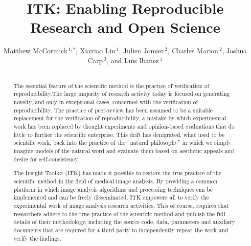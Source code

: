 \documentclass{frontiersENG} %
\def\journal{Neuroinformatics}%
\def\firstAuthorLast{Sample {et~al.}} %
\def\Authors{Matthew McCormick\,$^{1,*}$,
  Xiaxiao Liu\,$^{1}$,
  Julien Jomier\,$^{2}$,
  Charles Marion\,$^{2}$,
  Joshua Carp\,$^{3}$,
  and Luis Ibanez\,$^1$}
\begin{document}
\onecolumn
{}

\title[ITK Reproducible Research]{ITK: Enabling Reproducible Research and Open Science}
\author[\firstAuthorLast ]{\Authors}
\address{}
\correspondance{}
\extraAuth{}%

\maketitle
\begin{abstract}

\section{}
The essential feature of the scientific method is the practice of verification of reproducibility.The large majority of research activity today is focused on generating novelty, and only in exceptional cases, concerned with the verification of reproducibility. The practice of peer-review has been assumed to be a suitable replacement for the verification of reproducibility, a mistake by which experimental work has been replaced by thought experiments and opinion-based evaluations that do little to further the scientific enterprise. This drift has denigrated, what used to be scientific work, back into the practice of the “natural philosophy” in which we simply imagine models of the natural word and evaluate them based on aesthetic appeals and desire for self-consistency.

The Insight Toolkit (ITK) has made it possible to restore the true practice of the scientific method in the field of medical image analysis. By providing a common platform in which image analysis algorithms and processing techniques can be implemented and can be freely disseminated. ITK empowers all to verify the experimental work of image analysis research activities. This of course, requires that researchers adhere to the true practice of the scientific method and publish the full details of their methodology, including the source code, data, parameters and auxiliary documents that are required for a third party to independently repeat the work and verify the findings.


\end{abstract}
\end{document}
